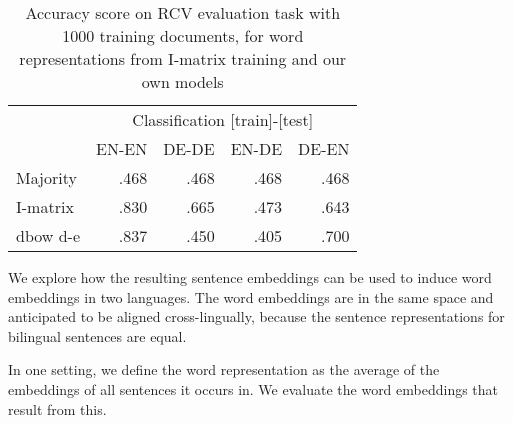 \begin{table}
\setlength\tabcolsep{2pt}
\begin{tabular}{l | r r r r}
		& \multicolumn{4}{c}{Classification [train]-[test]}	\\
		&EN-EN	&DE-DE	&EN-DE	&DE-EN	\\\hline
Majority	&.468		&.468		&.468		&.468		\\
I-matrix	&.830		&.665		&.473		&.643		\\
dbow d-e 	&.837		&.450		&.405		&.700		\\
\end{tabular}
\caption{Accuracy score on RCV evaluation task with 1000 training documents, for word representations from I-matrix training and our own models}
\label{t:dbow_bi_klemen}
\end{table}



We explore how the resulting sentence embeddings can be used to induce word embeddings in two languages. The word embeddings are in the same space and anticipated to be aligned cross-lingually, because the sentence representations for bilingual sentences are equal.

In one setting, we define the word representation as the average of the embeddings of all sentences it occurs in. We evaluate the word embeddings that result from this.



